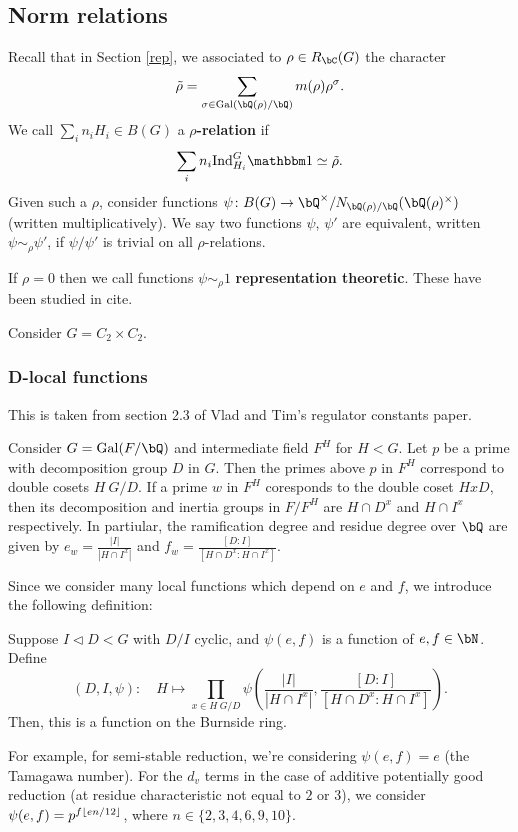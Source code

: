 \subsection{Norm relations}

Recall that in Section \ref{rep}, we associated to $\rho \in R_{\bC}(G)$ the character
    \[ \tilde{\rho} = \sum_{\sigma \in \Gal(\bQ(\rho) / \bQ)} m(\rho) \rho^{\sigma} .\]
 We call $\sum_i n_i H_i \in B(G)$ a \textbf{$\rho$-relation} if 
    \[ \sum_i n_i \Ind_{H_i}^G \trivial \simeq \tilde{\rho}. \]
Given such a $\rho$, consider functions $\psi \colon B(G) \to \bQ^{\times} / N_{\bQ(\rho) / \bQ}(\bQ(\rho)^\times)$ (written multiplicatively). We say two functions $\psi$, $\psi'$ are equivalent, written $\psi \sim_{\rho} \psi'$, if $\psi / \psi'$ is trivial on all $\rho$-relations. 

\begin{rem}
    If $\rho = 0$ then we call functions $\psi \sim_{\rho} 1$ \textbf{representation theoretic}. These have been studied in {\color{red} cite}.
\end{rem}


\begin{example}
    Consider $G = C_2 \times C_2$.
\end{example}


\subsubsection{D-local functions}\label{D-loc}

This is taken from section 2.3 of Vlad and Tim's regulator constants paper.

Consider $G = \Gal(F / \bQ)$ and intermediate field $F^H$ for $H < G$. Let $p$ be a prime with decomposition group $D$ in $G$. 
Then the primes above $p$ in $F^H$ correspond to double cosets $H\ G/ D$. If a prime $w$ in $F^H$ coresponds to the double coset $HxD$, then its decomposition and inertia groups in $F / F^H$ are $H \cap D^x$ and $H \cap I^x$ respectively. In partiular, the ramification degree and residue degree over $\bQ$ are given by $e_w = \frac{|I|}{|H \cap I^x|}$ and $f_w = \frac{[D \colon I]}{[H \cap D^x \colon H \cap I^x]}$. 

Since we consider many local functions which depend on $e$ and $f$, we introduce the following definition:

\begin{defn}
    Suppose $I \triangleleft D < G$ with $D / I$ cyclic, and $\psi(e,f)$ is a function of $e, f \in \bN$. Define
    \[ \left(D, I, \psi\right) \colon \quad H \mapsto \prod_{x \in H\ G / D} \psi\left(\frac{|I|}{|H \cap I^x|}, \frac{[D \colon I]}{[H \cap D^x \colon H \cap I^x]}\right). \]
    Then, this is a function on the Burnside ring.
\end{defn}

For example, for semi-stable reduction, we're considering $\psi(e, f) = e$ (the Tamagawa number). For the $d_v$ terms in the case of additive potentially good reduction (at residue characteristic not equal to $2$ or $3$), we consider $\psi(e, f) = p^{f \lfloor e n /12\rfloor}$, where $n \in \{2,3,4,6,9,10\}$.




